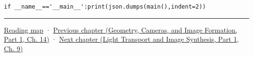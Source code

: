 \begin{verbatim}
if __name__=='__main__':print(json.dumps(main(),indent=2))
\end{verbatim}

\begin{center}\rule{0.5\linewidth}{0.5pt}\end{center}

\hyperref[volume-reading-map]{Reading map} · \href{../03-Geometry-Cameras-and-Image-Formation-P01/main.pdf\#nameddest=04-visual-computing-ii-ch033-projection-scale-and-incidence-geometry}{Previous chapter (Geometry, Cameras, and Image Formation, Part 1, Ch. 14)} · \href{../04-Light-Transport-and-Image-Synthesis-P01/main.pdf\#nameddest=04-visual-computing-ii-ch035-a-complete-renderer-as-an-executable-forward-model}{Next chapter (Light Transport and Image Synthesis, Part 1, Ch. 9)}
